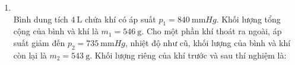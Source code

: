 \begin{enumerate}[label=\bfseries Câu \arabic*:, leftmargin=1.7cm]
\item {}\\
Bình dung tích $\SI{4}{\liter}$ chứa khí có áp suất $p_1=\SI{840}{\milli\meter Hg}$. Khối lượng tổng cộng của bình và khí là $m_1=\SI{546}{\gram}$. Cho một phần khí thoát ra ngoài, áp suất giảm đến $p_2=\SI{735}{\milli\meter Hg}$, nhiệt độ như cũ, khối lượng của bình và khí còn lại là $m_2=\SI{543}{\gram}$. Khối lượng riêng của khí trước và sau thí nghiệm là:


\end{enumerate}
